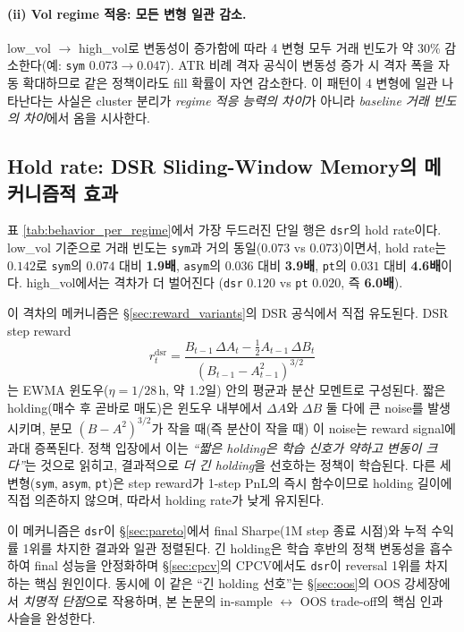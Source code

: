 \documentclass[11pt, a4paper]{article}
\begin{document}
\paragraph{(ii) Vol regime 적응: 모든 변형 일관 감소.}
low\_vol $\to$ high\_vol로 변동성이 증가함에 따라 4 변형 모두 거래 빈도가 약
30\% 감소한다(예: \texttt{sym} $0.073 \to 0.047$). ATR 비례 격자 공식이 변동성
증가 시 격자 폭을 자동 확대하므로 같은 정책이라도 fill 확률이 자연 감소한다.
이 패턴이 4 변형에 일관 나타난다는 사실은 cluster 분리가 \emph{regime 적응 능력의
차이}가 아니라 \emph{baseline 거래 빈도의 차이}에서 옴을 시사한다.

\subsection{Hold rate: DSR Sliding-Window Memory의 메커니즘적 효과}
\label{sec:mechanism_hold_rate}

표 \ref{tab:behavior_per_regime}에서 가장 두드러진 단일 행은 \texttt{dsr}의 hold
rate이다. low\_vol 기준으로 거래 빈도는 \texttt{sym}과 거의 동일($0.073$ vs
$0.073$)이면서, hold rate는 $0.142$로 \texttt{sym}의 $0.074$ 대비
\textbf{1.9배}, \texttt{asym}의 $0.036$ 대비 \textbf{3.9배}, \texttt{pt}의
$0.031$ 대비 \textbf{4.6배}이다. high\_vol에서는 격차가 더 벌어진다
(\texttt{dsr} $0.120$ vs \texttt{pt} $0.020$, 즉 \textbf{6.0배}).

이 격차의 메커니즘은 \S\ref{sec:reward_variants}의 DSR 공식에서 직접 유도된다.
DSR step reward
\[
r_t^{\mathrm{dsr}} =
\frac{B_{t-1} \, \Delta A_t - \tfrac{1}{2} A_{t-1} \, \Delta B_t}
     {(B_{t-1} - A_{t-1}^2)^{3/2}}
\]
는 EWMA 윈도우($\eta = 1/28\,\mathrm{h}$, 약 1.2일) 안의 평균과 분산 모멘트로
구성된다. 짧은 holding(매수 후 곧바로 매도)은 윈도우 내부에서 $\Delta A$와 $\Delta B$
둘 다에 큰 noise를 발생시키며, 분모 $(B - A^2)^{3/2}$가 작을 때(즉 분산이 작을 때)
이 noise는 reward signal에 과대 증폭된다. 정책 입장에서 이는
\emph{``짧은 holding은 학습 신호가 약하고 변동이 크다''}는 것으로 읽히고, 결과적으로
\emph{더 긴 holding}을 선호하는 정책이 학습된다. 다른 세 변형(\texttt{sym},
\texttt{asym}, \texttt{pt})은 step reward가 1-step PnL의 즉시 함수이므로 holding
길이에 직접 의존하지 않으며, 따라서 holding rate가 낮게 유지된다.

이 메커니즘은 \texttt{dsr}이 \S\ref{sec:pareto}에서 final Sharpe(1M step 종료 시점)와
누적 수익률 1위를 차지한 결과와 일관 정렬된다. 긴 holding은 학습 후반의 정책
변동성을 흡수하여 final 성능을 안정화하며 \S\ref{sec:cpcv}의 CPCV에서도
\texttt{dsr}이 reversal 1위를 차지하는 핵심 원인이다. 동시에 이 같은
``긴 holding 선호''는 \S\ref{sec:oos}의 OOS 강세장에서 \emph{치명적 단점}으로
작용하며, 본 논문의 in-sample $\leftrightarrow$ OOS trade-off의 핵심 인과 사슬을
완성한다.
\end{document}
